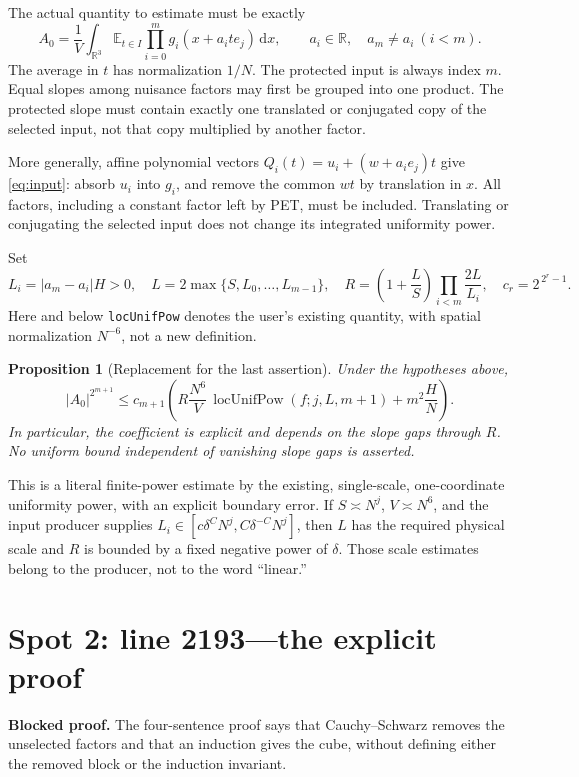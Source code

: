 \documentclass[11pt]{article}
\newcommand{\R}{\mathbb R}
\newcommand{\E}{\mathbb E}
\newcommand{\dd}{\,\mathrm d}
\newcommand{\idname}[1]{\nolinkurl{#1}}
\newtheorem{proposition}[lemma]{Proposition}
\theoremstyle{definition}\newtheorem{definition}[lemma]{Definition}
\begin{document}
The actual quantity to estimate must be exactly
\begin{equation}\label{eq:input}
 A_0=\frac1V\int_{\R^3}\E_{t\in I}
       \prod_{i=0}^m g_i(x+a_i t e_j)\dd x,
 \qquad a_i\in\R,\quad a_m\ne a_i\ (i<m).
\end{equation}
The average in $t$ has normalization $1/N$. The protected input is always index $m$. Equal slopes among nuisance factors may first be grouped into one product. The protected slope must contain exactly one translated or conjugated copy of the selected input, not that copy multiplied by another factor.

More generally, affine polynomial vectors $Q_i(t)=u_i+(w+a_i e_j)t$ give \eqref{eq:input}: absorb $u_i$ into $g_i$, and remove the common $wt$ by translation in $x$. All factors, including a constant factor left by PET, must be included. Translating or conjugating the selected input does not change its integrated uniformity power.

Set
\begin{equation}\label{eq:constants}
 L_i=|a_m-a_i|H>0,\quad
 L=2\max\{S,L_0,\ldots,L_{m-1}\},\quad
 R=\left(1+\frac LS\right)\prod_{i<m}\frac{2L}{L_i},\quad
 c_r=2^{\,2^r-1}.
\end{equation}
Here and below \idname{locUnifPow} denotes the user's existing quantity, with spatial normalization $N^{-6}$, not a new definition.

\begin{proposition}[Replacement for the last assertion]\label{prop:replacement}
Under the hypotheses above,
\begin{equation}\label{eq:main}
 |A_0|^{2^{m+1}}
 \leq c_{m+1}\left(
 R\frac{N^6}{V}\,
 \operatorname{locUnifPow}(f;j,L,m+1)
 +m^2\frac HN\right).
\end{equation}
In particular, the coefficient is explicit and depends on the slope gaps through $R$. No uniform bound independent of vanishing slope gaps is asserted.
\end{proposition}

This is a literal finite-power estimate by the existing, single-scale, one-coordinate uniformity power, with an explicit boundary error. If $S\asymp N^j$, $V\asymp N^6$, and the input producer supplies
$L_i\in[c\delta^C N^j,C\delta^{-C}N^j]$, then $L$ has the required physical scale and $R$ is bounded by a fixed negative power of $\delta$. Those scale estimates belong to the producer, not to the word ``linear.''

\section*{Spot 2: line 2193---the explicit proof}
\noindent\textbf{Blocked proof.} The four-sentence proof says that Cauchy--Schwarz removes the unselected factors and that an induction gives the cube, without defining either the removed block or the induction invariant.
\end{document}

